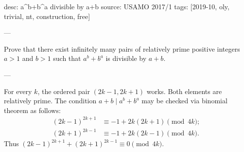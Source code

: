 desc: a^b+b^a divisible by a+b
source: USAMO 2017/1
tags: [2019-10, oly, trivial, nt, construction, free]

---

Prove that there exist infinitely many pairs of relatively prime positive integers $a>1$ and $b>1$ such that $a^b+b^a$ is divisible by $a+b$.

---

For every $k$, the ordered pair $(2k-1,2k+1)$ works. Both elements are relatively prime. The condition $a+b\mid a^b+b^a$ may be checked via binomial theorem as follows:
\begin{align*}
    (2k-1)^{2k+1}
    &\equiv-1+2k(2k+1)\pmod{4k};\\
    (2k+1)^{2k-1}
    &\equiv-1+2k(2k-1)\pmod{4k}.
\end{align*}
Thus $(2k-1)^{2k+1}+(2k+1)^{2k-1}\equiv0\pmod{4k}$.

